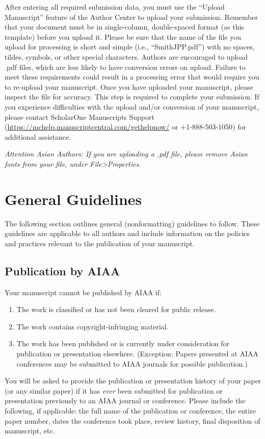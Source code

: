 \documentclass[journal]{new-aiaa}
\begin{document}
After entering all required submission data, you must use the “Upload Manuscript” feature of the Author Center to upload your submission. Remember that your document must be in single-column, double-spaced format (as this template) before you upload it. Please be sure that the name of the file you upload for processing is short and simple (i.e., “SmithJPP.pdf”) with no spaces, tildes, symbols, or other special characters. Authors are encouraged to upload .pdf files, which are less likely to have conversion errors on upload. Failure to meet these requirements could result in a processing error that would require you to re-upload your manuscript. Once you have uploaded your manuscript, please inspect the file for accuracy. This step is required to complete your submission. If you experience difficulties with the upload and/or conversion of your manuscript, please contact ScholarOne Manuscripts Support (\url{https://mchelp.manuscriptcentral.com/gethelpnow/} or +1-888-503-1050) for additional assistance. 

\emph{Attention Asian Authors: If you are uploading a .pdf file, please remove Asian fonts from your file, under File>Properties.}

\section{General Guidelines}

The following section outlines general (nonformatting) guidelines to follow. These guidelines are applicable to all authors and include information on the policies and practices relevant to the publication of your manuscript.

\subsection{Publication by AIAA}
Your manuscript cannot be published by AIAA if:
\begin{enumerate}
\item The work is classified or has not been cleared for public release.
\item The work contains copyright-infringing material.
\item The work has been published or is currently under consideration for publication or presentation elsewhere. (Exception: Papers presented at AIAA conferences may be submitted to AIAA journals for possible publication.)
\end{enumerate}

You will be asked to provide the publication or presentation history of your paper (or any similar paper) if it has \emph{ever} been submitted for publication or presentation previously to an AIAA journal or conference. Please include the following, if applicable: the full name of the publication or conference, the entire paper number, dates the conference took place, review history, final disposition of manuscript, etc.
\end{document}
